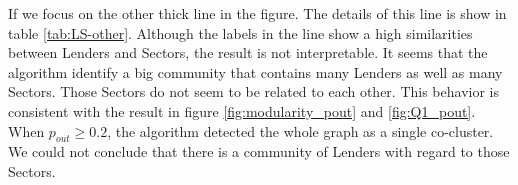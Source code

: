 \begin{table}[H]
	\centering
	\caption{A result in Lender-Sector community detection}
	\label{tab:LS-agriculture}
\end{table}

If we focus on the other thick line in the figure.
The details of this line is show in table \ref{tab:LS-other}.
Although the labels in the line show a high similarities between Lenders and Sectors,
the result is not interpretable.
It seems that the algorithm identify a big community that contains many Lenders as well as many Sectors.
Those Sectors do not seem to be related to each other.
This behavior is consistent with the result in figure \ref{fig:modularity_pout} and \ref{fig:Q1_pout}.
When $p_{out} \ge 0.2$, the algorithm detected the whole graph as a single co-cluster.
We could not conclude that there is a community of Lenders with regard to those Sectors.

